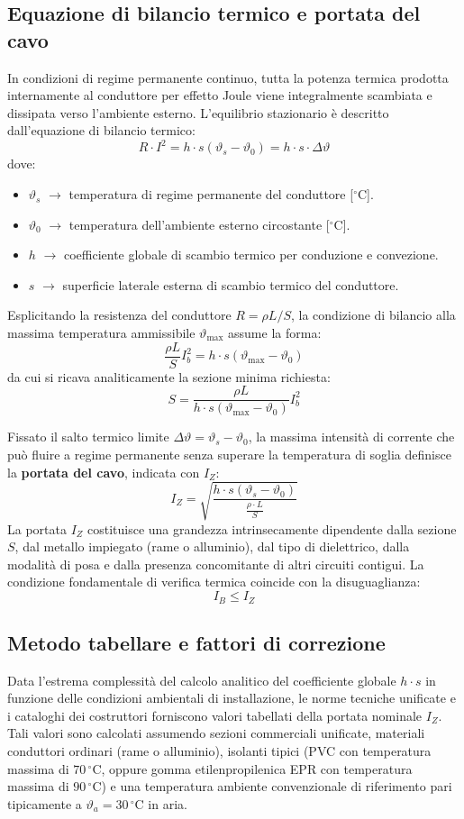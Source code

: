 \subsection{Equazione di bilancio termico e portata del cavo}
In condizioni di regime permanente continuo, tutta la potenza termica prodotta internamente al conduttore per effetto Joule viene integralmente scambiata e dissipata verso l'ambiente esterno. L'equilibrio stazionario è descritto dall'equazione di bilancio termico:
\[ R \cdot I^2 = h \cdot s (\vartheta_s - \vartheta_0) = h \cdot s \cdot \Delta\vartheta \]
dove:
\begin{itemize}
    \item \textbf{$\vartheta_s$} $\rightarrow$ temperatura di regime permanente del conduttore [${}^\circ\text{C}$].
    \item \textbf{$\vartheta_0$} $\rightarrow$ temperatura dell'ambiente esterno circostante [${}^\circ\text{C}$].
    \item \textbf{$h$} $\rightarrow$ coefficiente globale di scambio termico per conduzione e convezione.
    \item \textbf{$s$} $\rightarrow$ superficie laterale esterna di scambio termico del conduttore.
\end{itemize}

Esplicitando la resistenza del conduttore $R = \rho L / S$, la condizione di bilancio alla massima temperatura ammissibile $\vartheta_{\text{max}}$ assume la forma:
\[ \frac{\rho L}{S} I_b^2 = h \cdot s (\vartheta_{\text{max}} - \vartheta_0) \]
da cui si ricava analiticamente la sezione minima richiesta:
\[ S = \frac{\rho L}{h \cdot s (\vartheta_{\text{max}} - \vartheta_0)} I_b^2 \]

Fissato il salto termico limite $\Delta\vartheta = \vartheta_s - \vartheta_0$, la massima intensità di corrente che può fluire a regime permanente senza superare la temperatura di soglia definisce la \textbf{portata del cavo}, indicata con $I_Z$:
\[ I_Z = \sqrt{\frac{h \cdot s (\vartheta_s - \vartheta_0)}{\frac{\rho \cdot L}{S}}} \]
La portata $I_Z$ costituisce una grandezza intrinsecamente dipendente dalla sezione $S$, dal metallo impiegato (rame o alluminio), dal tipo di dielettrico, dalla modalità di posa e dalla presenza concomitante di altri circuiti contigui. La condizione fondamentale di verifica termica coincide con la disuguaglianza:
\[ I_B \le I_Z \]

\subsection{Metodo tabellare e fattori di correzione}
Data l'estrema complessità del calcolo analitico del coefficiente globale $h \cdot s$ in funzione delle condizioni ambientali di installazione, le norme tecniche unificate e i cataloghi dei costruttori forniscono valori tabellati della portata nominale $I_Z$. Tali valori sono calcolati assumendo sezioni commerciali unificate, materiali conduttori ordinari (rame o alluminio), isolanti tipici (PVC con temperatura massima di $70\,{}^\circ\text{C}$, oppure gomma etilenpropilenica EPR con temperatura massima di $90\,{}^\circ\text{C}$) e una temperatura ambiente convenzionale di riferimento pari tipicamente a $\vartheta_a = 30\,{}^\circ\text{C}$ in aria.

